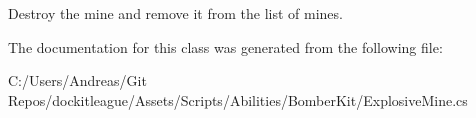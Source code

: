 Destroy the mine and remove it from the list of mines. 



The documentation for this class was generated from the following file\+:\begin{DoxyCompactItemize}
\item 
C\+:/\+Users/\+Andreas/\+Git Repos/dockitleague/\+Assets/\+Scripts/\+Abilities/\+Bomber\+Kit/Explosive\+Mine.\+cs\end{DoxyCompactItemize}
